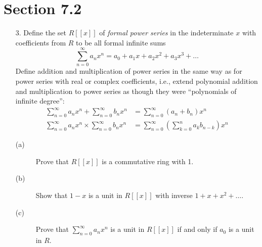 \documentclass[12pt,leqno]{book}
\theoremstyle{definition}
\begin{document}
\section*{Section 7.2}
\begin{enumerate}
 \item [3.]Define the set $R[[x]]$ of \textit{formal power series} in the indeterminate $x$ with coefficients from $R$ to be all formal infinite sums \[\sum_{n=0}^{\infty}a_nx^n=a_0+a_1x+a_2x^2+a_3x^3+\hdots\] Define addition and multiplication of power series in the same way as for power series with real or complex coefficients, i.e., extend polynomial addition and multiplication to power series as though they were ``polynomials of infinite degree'':\begin{align*}\sum_{n=0}^{\infty}a_nx^n+\sum_{n=0}^{\infty}b_nx^n&=\sum_{n=0}^{\infty}(a_n+b_n)x^n\\\sum_{n=0}^{\infty}a_nx^n\times\sum_{n=0}^{\infty}b_nx^n&=\sum_{n=0}^{\infty}\left(\sum_{k=0}^na_kb_{n-k}\right)x^n\end{align*}
\begin{description}
 \item [(a)] Prove that $R[[x]]$ is a commutative ring with 1.
 \item [(b)] Show that $1-x$ is a unit in $R[[x]]$ with inverse $1+x+x^2+\hdots$.
 \item [(c)] Prove that $\sum_{n=0}^{\infty}a_nx^n$ is a unit in $R[[x]]$ if and only if $a_0$ is a unit in $R$.
\end{description}


\end{enumerate}
\end{document}
